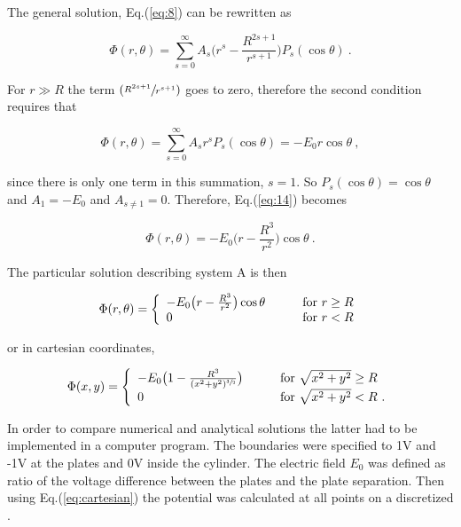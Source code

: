 \documentclass[a4paper]{jpconf}
\begin{document}
\noindent The general solution, Eq.(\ref{eq:8}) can be rewritten as

\begin{equation}
\Phi(r,\theta) = \sum_{s=0}^{\infty} A_s \bigg(r^s - \frac{R^{2s+1}}{r^{s+1}}\bigg) P_s (\cos \theta)~.
\end{equation}

\noindent For $r\gg R$ the term $(\sfrac{R^{2s+1}}{r^{s+1}})$ goes to zero, therefore the second condition requires that

\begin{equation}
\Phi(r,\theta)=\sum_{s=0}^{\infty} A_s r^s P_s(\cos \theta) = -E_0 r \cos \theta~,
\label{eq:14}
\end{equation}

\noindent since there is only one term in this summation, $s=1$. So $P_s(\cos \theta)= \cos \theta$ and $A_1 = -E_0$ and $A_{s \ne 1} = 0$. Therefore, Eq.(\ref{eq:14}) becomes

\begin{equation}
\Phi(r,\theta) = -E_0 \bigg(r - \frac{R^3}{r^2}\bigg) \cos \theta~.
\end{equation}

The particular solution describing system A is then

\begin{equation}
\Phi(r,\theta) = \left\{ 
  \begin{array}{l l}
   -E_0 \big(r - \frac{R^3}{r^2}\big) \cos \theta  & \qquad \text{for $r \geq R$}\\
    0 & \qquad \text{for $r < R$}
  \end{array} \right.
\end{equation}

\noindent or in cartesian coordinates, 

\begin{equation}
\Phi(x,y) = \left\{ 
  \begin{array}{l l}
   -E_0 \big(1 - \frac{R^3}{(x^2 + y^2)^{\sfrac{3}{2}}}\big) & \qquad \text{for $\sqrt{x^2 + y^2} \geq R$}\\
    0 & \qquad \text{for $\sqrt{x^2 + y^2} < R$~.}
  \end{array} \right.
  \label{eq:cartesian}
\end{equation}

In order to compare numerical and analytical solutions the latter had to be implemented in a computer program. The boundaries were specified to 1V and -1V at the plates and 0V inside the cylinder. The electric field $E_0$ was defined as ratio of the voltage difference between the plates and the plate separation. Then using Eq.(\ref{eq:cartesian}) the potential was calculated at all points on a discretized . \\
\end{document}
